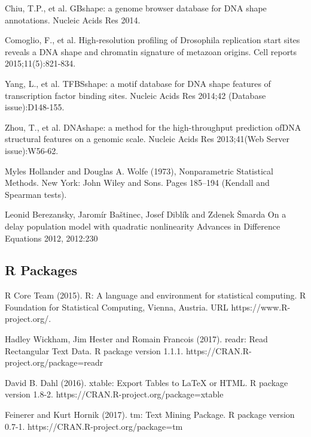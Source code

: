 \documentclass[preprint, 8pt]{elsarticle}
\theoremstyle{definition}
\begin{document}

\begin{thebibliography}{00}
\footnotesize	

Chiu, T.P., et al. 
GBshape: a genome browser database for DNA shape annotations. 
Nucleic Acids Res 2014.
	
Comoglio, F., et al. 
\newblock High-resolution profiling of Drosophila replication start sites reveals a DNA shape and chromatin signature of metazoan origins. 
\newblock Cell reports 2015;11(5):821-834.
	
Yang, L., et al. 
\newblock TFBSshape: a motif database for DNA shape features of transcription factor binding sites. 
\newblock Nucleic Acids Res 2014;42 (Database issue):D148-155.
	
Zhou, T., et al. 
\newblock DNAshape: a method for the high-throughput prediction ofDNA structural features on a genomic scale. 
\newblock Nucleic Acids Res 2013;41(Web Server issue):W56-62.

Myles Hollander and Douglas A. Wolfe (1973), 
\newblock Nonparametric Statistical Methods. 
\newblock New York: John Wiley and Sons. Pages 185–194 (Kendall and Spearman tests).

 Leonid Berezansky, Jaromír Baštinec, Josef Diblík and Zdenek Šmarda
\newblock On a delay population model with quadratic nonlinearity 
\newblock Advances in Difference Equations 2012, 2012:230

\subsection{R Packages}

R Core Team (2015). 
\newblock R: A language and environment for statistical computing. R Foundation for Statistical Computing, Vienna, Austria.
\newblock URL https://www.R-project.org/.

 Hadley Wickham, Jim Hester and Romain Francois (2017). readr: Read
\newblock Rectangular Text Data. R package version 1.1.1.
\newblock https://CRAN.R-project.org/package=readr

 David B. Dahl (2016). 
\newblock xtable: Export Tables to LaTeX or HTML. R package version 1.8-2.
\newblock https://CRAN.R-project.org/package=xtable

  Feinerer and Kurt Hornik (2017).
\newblock tm: Text Mining Package. 
\newblock R package version 0.7-1. https://CRAN.R-project.org/package=tm


\end{thebibliography}
\end{document}
